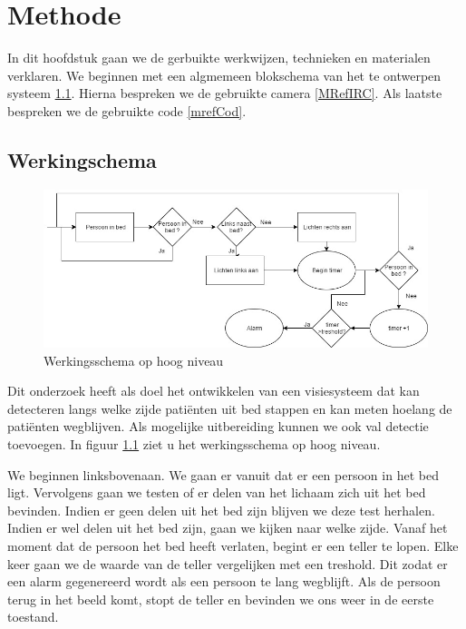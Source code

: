 \chapter{Methode}
In dit hoofdstuk gaan we de gerbuikte werkwijzen, technieken en materialen verklaren. We beginnen met een algmemeen blokschema van het te ontwerpen systeem \ref{MRefWeS}. Hierna bespreken we de gebruikte camera \ref{MRefIRC}. Als laatste bespreken we de gebruikte code \ref{mrefCod}.

\section{Werkingschema}
\label{MRefWeS}
\begin{figure}[h]
	\includegraphics[scale=0.5]{HoogNiveauBlokDiagram}
	\caption{Werkingsschema op hoog niveau}
	\label{imgWeS}
\end{figure}
Dit onderzoek heeft als doel het ontwikkelen van een visiesysteem dat kan detecteren langs welke zijde pati\"enten uit bed stappen en kan meten hoelang de pati\"enten wegblijven. Als mogelijke uitbereiding kunnen we ook val detectie toevoegen. In figuur \ref{imgWeS} ziet u het werkingsschema op hoog niveau.

We beginnen linksbovenaan. We gaan er vanuit dat er een persoon in het bed ligt. Vervolgens gaan we testen of er delen van het lichaam zich uit het bed bevinden. Indien er geen delen uit het bed zijn blijven we deze test herhalen. Indien er wel delen uit het bed zijn, gaan we kijken naar welke zijde. Vanaf het moment dat de persoon het bed heeft verlaten, begint er een teller te lopen. Elke keer gaan we de waarde van de teller vergelijken met een treshold. Dit zodat er een alarm gegenereerd wordt als een persoon te lang wegblijft. Als de persoon terug in het beeld komt, stopt de teller en bevinden we ons weer in de eerste toestand. 

